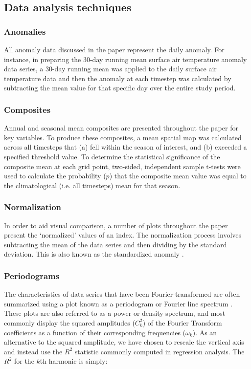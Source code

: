 \subsection{Data analysis techniques}

\subsubsection{Anomalies}
All anomaly data discussed in the paper represent the daily anomaly. For instance, in preparing the 30-day running mean surface air temperature anomaly data series, a 30-day running mean was applied to the daily surface air temperature data and then the anomaly at each timestep was calculated by subtracting the mean value for that specific day over the entire study period.

\subsubsection{Composites}
Annual and seasonal mean composites are presented throughout the paper for key variables. To produce these composites, a mean spatial map was calculated across all timesteps that (a) fell within the season of interest, and (b) exceeded a specified threshold value. To determine the statistical significance of the composite mean at each grid point, two-sided, independent sample t-tests were used to calculate the probability ($p$) that the composite mean value was equal to the climatological (i.e. all timesteps) mean for that season.

\subsubsection{Normalization}
In order to aid visual comparison, a number of plots throughout the paper present the `normalized' values of an index. The normalization process involves subtracting the mean of the data series and then dividing by the standard deviation. This is also known as the standardized anomaly \citep{Wilks2011}. 

\subsubsection{Periodograms} %
The characteristics of data series that have been Fourier-transformed are often summarized using a plot known as a periodogram or Fourier line spectrum \citep{Wilks2011}. These plots are also referred to as a power or density spectrum, and most commonly display the squared amplitudes ($C_k^2$) of the Fourier Transform coefficients as a function of their corresponding frequencies ($\omega_k$). As an alternative to the squared amplitude, we have chosen to rescale the vertical axis and instead use the $R^2$ statistic commonly computed in regression analysis. The $R^2$ for the $k$th harmonic is simply:

